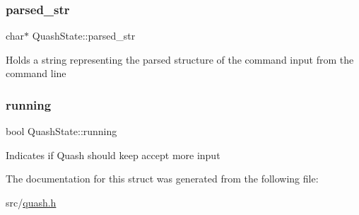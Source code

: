 \subsubsection{\texorpdfstring{parsed\+\_\+str}{parsed\_str}}
{\footnotesize\ttfamily char$\ast$ Quash\+State\+::parsed\+\_\+str}

Holds a string representing the parsed structure of the command input from the command line \mbox{\label{structQuashState_a7db3a718696ee9d0c7f8b649ccb88bb4}} 
\subsubsection{\texorpdfstring{running}{running}}
{\footnotesize\ttfamily bool Quash\+State\+::running}

Indicates if Quash should keep accept more input 

The documentation for this struct was generated from the following file\+:\begin{DoxyCompactItemize}
\item 
src/\hyperlink{quash_8h}{quash.\+h}\end{DoxyCompactItemize}
